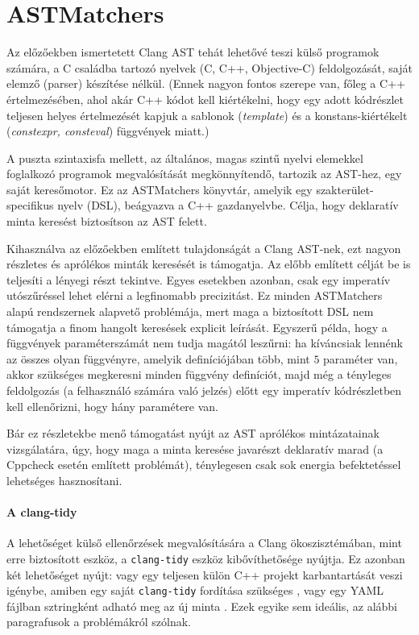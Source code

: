 \section*{ASTMatchers}

Az előzőekben ismertetett Clang \gls{AST} tehát lehetővé teszi külső programok számára, a C családba tartozó nyelvek (C, C++, Objective-C) feldolgozását, saját elemző (parser) készítése nélkül.
(Ennek nagyon fontos szerepe van, főleg a C++ értelmezésében, ahol akár C++ kódot kell kiértékelni, hogy egy adott kódrészlet teljesen helyes értelmezését kapjuk a sablonok ({\it template}) és a konstans-kiértékelt ({\it constexpr, consteval}) függvények miatt.)

A puszta szintaxisfa mellett, az általános, magas szintű nyelvi elemekkel foglalkozó programok megvalósítását megkönnyítendő, tartozik az \gls{AST}-hez, egy saját keresőmotor.
Ez az ASTMatchers \cite{llvmprojectASTMatcherReference} könyvtár, amelyik egy szakterület-specifikus nyelv (\gls{DSL}), beágyazva a C++ gazdanyelvbe.
Célja, hogy deklaratív minta keresést biztosítson az \gls{AST} felett.

Kihasználva az előzőekben említett tulajdonságát a Clang \gls{AST}-nek, ezt nagyon részletes és aprólékos minták keresését is támogatja.
Az előbb említett célját be is teljesíti a lényegi részt tekintve.
Egyes esetekben azonban, csak egy imperatív utószűréssel lehet elérni a legfinomabb precizitást.
Ez minden ASTMatchers alapú rendszernek alapvető problémája, mert maga a biztosított \gls{DSL} nem támogatja a finom hangolt keresések explicit leírását.
Egyszerű példa, hogy a függvények paraméterszámát nem tudja magától leszűrni: ha kíváncsiak lennénk az összes olyan függvényre, amelyik definíciójában több, mint $5$ paraméter van, akkor szükséges megkeresni minden függvény definíciót, majd még a tényleges feldolgozás (\pl a felhasználó számára való jelzés) előtt egy imperatív kódrészletben kell ellenőrizni, hogy hány paramétere van.

Bár ez részletekbe menő támogatást nyújt az \gls{AST} aprólékos mintázatainak vizsgálatára, úgy, hogy maga a minta keresése javarészt deklaratív marad (\ld a Cppcheck esetén említett problémát), ténylegesen csak sok energia befektetéssel lehetséges hasznosítani.

\paragraph{A clang-tidy}
A lehetőséget külső ellenőrzések megvalósítására a Clang ökoszisztémában, mint erre biztosított eszköz, a {\tt clang-tidy} eszköz kibővíthetősége nyújtja.
Ez azonban két lehetőséget nyújt: vagy egy teljesen külön C++ projekt karbantartását veszi igénybe, amiben egy saját {\tt clang-tidy} fordítása szükséges \cite{llvmprojectGettingInvolvedExtra}, vagy egy YAML fájlban sztringként adható meg az új minta \cite{llvmprojectQueryBasedCustom}.
Ezek egyike sem ideális, az alábbi paragrafusok a problémákról szólnak.

